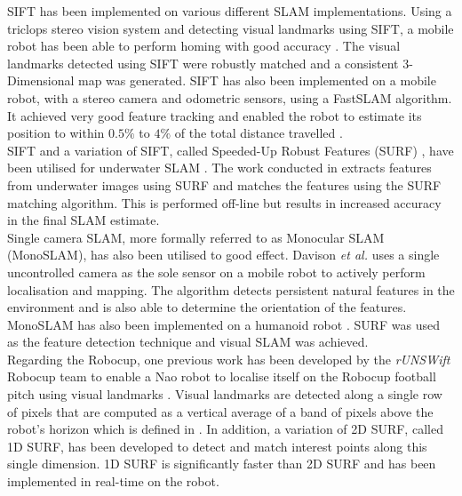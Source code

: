 \documentclass[11pt]{report}
\begin{document}
SIFT has been implemented on various different SLAM implementations. Using a triclops stereo vision system and detecting visual landmarks using SIFT, a mobile robot has been able to perform homing with good accuracy \cite{Se2001, Se2002}. The visual landmarks detected using SIFT were robustly matched and a consistent 3-Dimensional map was generated. SIFT has also been implemented on a mobile robot, with a stereo camera and odometric sensors, using a FastSLAM algorithm. It achieved very good feature tracking and enabled the robot to estimate its position to within $0.5\%$ to $4\%$ of the total distance travelled \cite{Barfoot2005}.\\

SIFT and a variation of SIFT, called Speeded-Up Robust Features (SURF) \cite{Bay2008}, have been utilised for underwater SLAM \cite{Aulinas2011, Thomas}. The work conducted in \cite{Aulinas2011} extracts features from underwater images using SURF and matches the features using the SURF matching algorithm. This is performed off-line but results in increased accuracy in the final SLAM estimate.\\

Single camera SLAM, more formally referred to as Monocular SLAM (MonoSLAM), has also been utilised to good effect. Davison \textit{et al.} \cite{Davison2007} uses a single uncontrolled camera as the sole sensor on a mobile robot to actively perform localisation and mapping. The algorithm detects persistent natural features in the environment and is also able to determine the orientation of the features. MonoSLAM has also been implemented on a humanoid robot \cite{Wang2011}. SURF was used as the feature detection technique and visual SLAM was achieved.\\

Regarding the Robocup, one previous work has been developed by the \textit{rUNSWift} Robocup team to enable a Nao robot to localise itself on the Robocup football pitch using visual landmarks \cite{Anderson}. Visual landmarks are detected along a single row of pixels that are computed as a vertical average of a band of pixels above the robot's horizon which is defined in \cite{Bhuman}. In addition, a variation of 2D SURF, called 1D SURF, has been developed to detect and match interest points along this single dimension. 1D SURF is significantly faster than 2D SURF and has been implemented in real-time on the robot.\\
\end{document}
